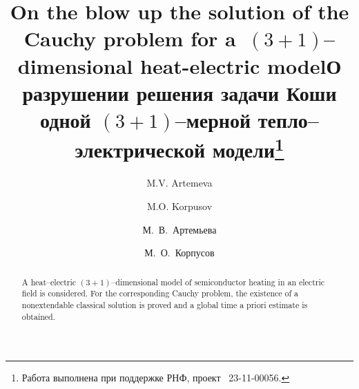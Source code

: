 


\begin{englishtitle} %
\title{On the blow up the solution of the Cauchy problem for a~$(3+1)$--dimensional heat-electric model}
\author{M.V. Artemeva  \and  M.O. Korpusov 
}

\maketitle

\begin{abstract}
A heat–electric $(3+1)$--dimensional model of semiconductor heating in an electric field is considered. For the corresponding Cauchy problem, the existence of a nonextendable classical solution is proved and a global time a priori estimate is obtained.

\end{abstract}
\end{englishtitle}

\iffalse
%
%


\documentclass[12pt]{llncs}  


\usepackage{iftex}

\ifPDFTeX
\usepackage[T2A]{fontenc}
\usepackage[utf8]{inputenc} %
\usepackage[english,russian]{babel}
\fi

\usepackage{todonotes} 

\usepackage[russian]{nla}


\fi

\title{О разрушении решения задачи Коши одной $(3+1)$--мерной тепло--электрической модели\thanks{Работа выполнена при поддержке РНФ, проект \textnumero~23-11-00056.}}
\author{М.~В.~Артемьева   \and  М.~О.~Корпусов 
}

